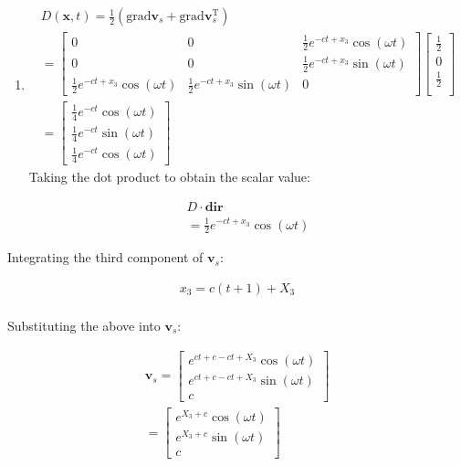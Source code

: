 \begin{problem}
\begin{enumerate}
    \item \begin{align}
        D(\mathbf{x}, t)=\frac{1}{2}(\text{grad}\mathbf{v}_{s}+\text{grad}\mathbf{v}_{s}^{\text{T}}) \\
        = \begin{bmatrix}
        0 & 0 & \frac{1}{2}e^{-ct+x_{3}}\cos(\omega t) \\
        0 & 0 & \frac{1}{2}e^{-ct+x_{3}}\sin(\omega t) \\
        \frac{1}{2}e^{-ct+x_{3}}\cos(\omega t) & \frac{1}{2}e^{-ct+x_{3}}\sin(\omega t) & 0
        \end{bmatrix}\begin{bmatrix}
        \frac{1}{2} \\
        0 \\
        \frac{1}{2} \\
        \end{bmatrix} \\= \begin{bmatrix}
        \frac{1}{4}e^{-ct}\cos(\omega t) \\
        \frac{1}{4}e^{-ct}\sin(\omega t) \\
        \frac{1}{4}e^{-ct}\cos(\omega t)
        \end{bmatrix}
        \end{align}
        Taking the dot product to obtain the scalar value:


\begin{align}
D\cdot \mathbf{\text{dir}}\\
= \frac{1}{2}e^{-ct+x_{3}}\cos(\omega t)
\end{align}

   \end{enumerate} 
   
   \item Integrating the third component of $\mathbf{v}_{s}$:

   \begin{align}
   x_{3}=c(t+1)+X_{3} \\
   \end{align}
   
   Substituting the above into $\mathbf{v}_{s}$:
   
   \begin{align}
   \mathbf{v}_{s}=\begin{bmatrix}
   e^{ct+c-ct+X_{3}}\cos(\omega t) \\
   e^{ct+c-ct+X_{3}}\sin(\omega t) \\
   c
   \end{bmatrix} \\
   = \begin{bmatrix}
   e^{X_{3}+c}\cos(\omega t) \\
   e^{X_{3}+c}\sin(\omega t) \\
   c
   \end{bmatrix}
   \end{align}
   

\end{problem}
